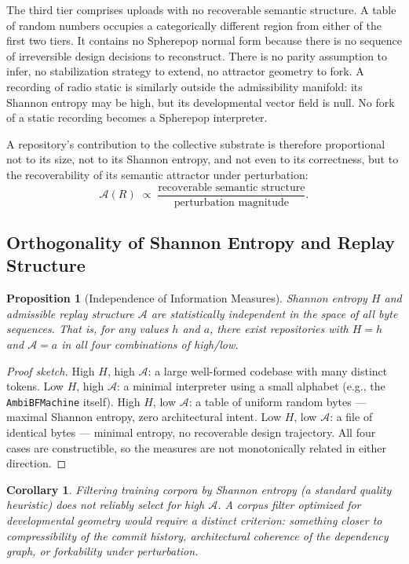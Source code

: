 \documentclass[11pt]{article}
\newtheorem{proposition}[theorem]{Proposition}
\newtheorem{corollary}[theorem]{Corollary}
\begin{document}
The third tier comprises uploads with no recoverable semantic structure. A table
of random numbers occupies a categorically different region from either of the
first two tiers. It contains no Spherepop normal form because there is no
sequence of irreversible design decisions to reconstruct. There is no parity
assumption to infer, no stabilization strategy to extend, no attractor geometry
to fork. A recording of radio static is similarly outside the admissibility
manifold: its Shannon entropy may be high, but its developmental vector field
is null. No fork of a static recording becomes a Spherepop interpreter.

A repository's contribution to the collective substrate is therefore proportional
not to its size, not to its Shannon entropy, and not even to its correctness,
but to the recoverability of its semantic attractor under perturbation:
\[
\mathcal{A}(R)
\;\propto\;
\frac{\text{recoverable semantic structure}}{\text{perturbation magnitude}}.
\]

\subsection*{Orthogonality of Shannon Entropy and Replay Structure}

\begin{proposition}[Independence of Information Measures]
Shannon entropy $H$ and admissible replay structure $\mathcal{A}$ are
statistically independent in the space of all byte sequences. That is, for any
values $h$ and $a$, there exist repositories with $H = h$ and $\mathcal{A} = a$
in all four combinations of high/low.
\end{proposition}

\begin{proof}[Proof sketch]
High $H$, high $\mathcal{A}$: a large well-formed codebase with many distinct
tokens. Low $H$, high $\mathcal{A}$: a minimal interpreter using a small
alphabet (e.g., the \texttt{AmbiBFMachine} itself). High $H$, low $\mathcal{A}$:
a table of uniform random bytes --- maximal Shannon entropy, zero architectural
intent. Low $H$, low $\mathcal{A}$: a file of identical bytes --- minimal
entropy, no recoverable design trajectory. All four cases are constructible,
so the measures are not monotonically related in either direction.
\end{proof}

\begin{corollary}
Filtering training corpora by Shannon entropy (a standard quality heuristic)
does not reliably select for high $\mathcal{A}$. A corpus filter optimized
for developmental geometry would require a distinct criterion: something closer
to compressibility of the commit history, architectural coherence of the
dependency graph, or forkability under perturbation.
\end{corollary}
\end{document}
